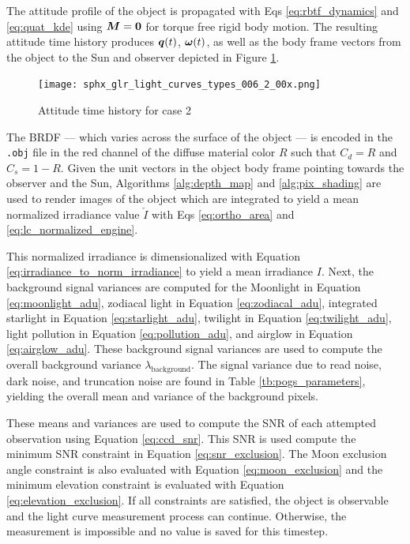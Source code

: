 The attitude profile of the object is propagated with Eqs \ref{eq:rbtf_dynamics} and \ref{eq:quat_kde} using $\bm{M}=\mathbf{0}$ for torque free rigid body motion. The resulting attitude time history produces $\bm{q}(t)$, $\bm{\omega}(t)$, as well as the body frame vectors from the object to the Sun and observer depicted in Figure \ref{fig:case2_attitude}.

\begin{figure}[!htb]
  \centering
  \texttt{[image: sphx\_glr\_light\_curves\_types\_006\_2\_00x.png]}
  \caption{Attitude time history for case 2}
  \label{fig:case2_attitude}
\end{figure}

The BRDF --- which varies across the surface of the object --- is encoded in the \texttt{.obj} file in the red channel of the diffuse material color $R$ such that $C_d = R$ and $C_s = 1 - R$. Given the unit vectors in the object body frame pointing towards the observer and the Sun, Algorithms \ref{alg:depth_map} and \ref{alg:pix_shading} are used to render images of the object which are integrated to yield a mean normalized irradiance value $\check{I}$ with Eqs \ref{eq:ortho_area} and \ref{eq:lc_normalized_engine}. 

This normalized irradiance is dimensionalized with Equation \ref{eq:irradiance_to_norm_irradiance} to yield a mean irradiance $I$. Next, the background signal variances are computed for the Moonlight in Equation \ref{eq:moonlight_adu}, zodiacal light in Equation \ref{eq:zodiacal_adu}, integrated starlight in Equation \ref{eq:starlight_adu}, twilight in Equation \ref{eq:twilight_adu}, light pollution in Equation \ref{eq:pollution_adu}, and airglow in Equation \ref{eq:airglow_adu}. These background signal variances are used to compute the overall background variance $\lambda_\mathrm{background}$. The signal variance due to read noise, dark noise, and truncation noise are found in Table \ref{tb:pogs_parameters}, yielding the overall mean and variance of the background pixels. 

These means and variances are used to compute the SNR of each attempted observation using Equation \ref{eq:ccd_snr}. This SNR is used compute the minimum SNR constraint in Equation \ref{eq:snr_exclusion}. The Moon exclusion angle constraint is also evaluated with Equation \ref{eq:moon_exclusion} and the minimum elevation constraint is evaluated with Equation \ref{eq:elevation_exclusion}. If all constraints are satisfied, the object is observable and the light curve measurement process can continue. Otherwise, the measurement is impossible and no value is saved for this timestep.

